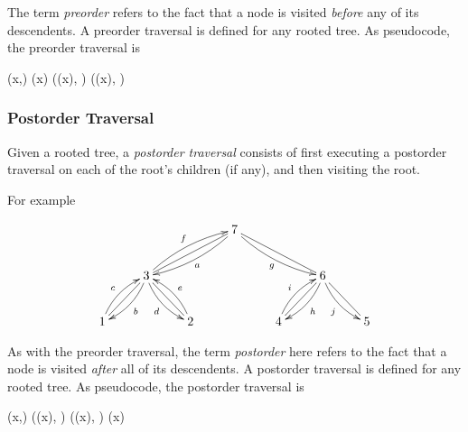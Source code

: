 \documentclass[12pt]{article}
\begin{document}
The term \emph{preorder} refers to the fact that a node is visited \emph{before} any of its descendents.  A preorder traversal is defined for any rooted tree.
As pseudocode, the preorder traversal is

\begin{program}
(x,)
(x)
((x), )
((x), )
\end{program}

\subsubsection*{Postorder Traversal}

Given a rooted tree, a \emph{postorder traversal} consists of first executing a postorder traversal on each of the root's children (if any), and then visiting the root.

For example

\[
\xymatrix{
    &&&7 \ar@/^/[dll]^a \ar@/_/[drr]_g \ar@{-}[dll] \ar@{-}[drr] \\
        &3 \ar@/^/[dl]^b \ar@/_/[dr]_d \ar@/^/[urr]^f \ar@{-}[dl] \ar@{-}[dr]
&&&& 6 \ar@/^/[dl]^h \ar@/_/[dr]_j \ar@{-}[dl] \ar@{-}[dr] \\
        1 \ar@/^/[ur]^c && 2 \ar@/_/[ul]_e && 4 \ar@/^/[ur]^i && 5
}
\]

As with the preorder traversal, the term \emph{postorder} here refers to the fact that a node is visited \emph{after} all of its descendents.  A postorder traversal is defined for any rooted tree.
As pseudocode, the postorder traversal is

\begin{program}
(x,)
((x), )
((x), )
(x)
\end{program}
\end{document}
